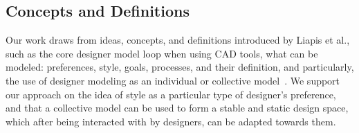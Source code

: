 \subsection{Concepts and Definitions}



Our work draws from ideas, concepts, and definitions introduced by Liapis et al., such as the core designer model loop when using CAD tools, what can be modeled: preferences, style, goals, processes, and their definition, and particularly, the use of designer modeling as an individual or collective model~. We support our approach on the idea of style as a particular type of designer's preference, and that a collective model can be used to form a stable and static design space, which after being interacted with by designers, can be adapted towards them.





